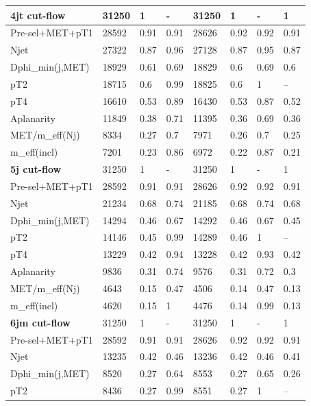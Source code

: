 \documentclass[11pt]{cernrep}
\begin{document}
\begin{table}[htbp]
\begin{tabular}{ | l || l | l | l || l | l | l || l | }
{\bf 4jt cut-flow} & 31250 & 1 & - & 31250 & 1 & - & 1  \\ \hline
Pre-sel+MET+pT1   & 28592 & 0.91 & 0.91 & 28626 & 0.92 & 0.92 & 0.91  \\ \hline
Njet              & 27322 & 0.87 & 0.96 & 27128 & 0.87 & 0.95 & 0.87  \\ \hline
Dphi\_min(j,MET)   & 18929 & 0.61 & 0.69 & 18829 & 0.6 & 0.69 & 0.6  \\ \hline
pT2               & 18715 & 0.6 & 0.99 & 18825 & 0.6 & 1 &     --       \\ \hline
pT4               & 16610 & 0.53 & 0.89 & 16430 & 0.53 & 0.87 & 0.52  \\ \hline
Aplanarity        & 11849 & 0.38 & 0.71 & 11395 & 0.36 & 0.69 & 0.36  \\ \hline
MET/m\_eff(Nj)     & 8334 & 0.27 & 0.7 & 7971 & 0.26 & 0.7 & 0.25  \\ \hline
m\_eff(incl)       & 7201 & 0.23 & 0.86 & 6972 & 0.22 & 0.87 & 0.21  \\ \hline
\hline
{\bf 5j cut-flow} & 31250 & 1 & - & 31250 & 1 & - & 1 \\ \hline
Pre-sel+MET+pT1   & 28592 & 0.91 & 0.91 & 28626 & 0.92 & 0.92 & 0.91 \\ \hline
Njet              & 21234 & 0.68 & 0.74 & 21185 & 0.68 & 0.74 & 0.68 \\ \hline
Dphi\_min(j,MET)   & 14294 & 0.46 & 0.67 & 14292 & 0.46 & 0.67 & 0.45 \\ \hline
pT2               & 14146 & 0.45 & 0.99 & 14289 & 0.46 & 1 &    --       \\ \hline
pT4               & 13229 & 0.42 & 0.94 & 13228 & 0.42 & 0.93 & 0.42 \\ \hline
Aplanarity        & 9836 & 0.31 & 0.74 & 9576 & 0.31 & 0.72 & 0.3 \\ \hline
MET/m\_eff(Nj)     & 4643 & 0.15 & 0.47 & 4506 & 0.14 & 0.47 & 0.13 \\ \hline
m\_eff(incl)       & 4620 & 0.15 & 1 & 4476 & 0.14 & 0.99 & 0.13 \\ \hline
\hline
{\bf 6jm cut-flow} & 31250 & 1 & - & 31250 & 1 & - & 1  \\ \hline
Pre-sel+MET+pT1   & 28592 & 0.91 & 0.91 & 28626 & 0.92 & 0.92 & 0.91  \\ \hline
Njet              & 13235 & 0.42 & 0.46 & 13236 & 0.42 & 0.46 & 0.41  \\ \hline
Dphi\_min(j,MET)   & 8520 & 0.27 & 0.64 & 8553 & 0.27 & 0.65 & 0.26  \\ \hline
pT2               & 8436 & 0.27 & 0.99 & 8551 & 0.27 & 1 &    --        \\ \hline

\end{tabular}
\end{table}
\end{document}
